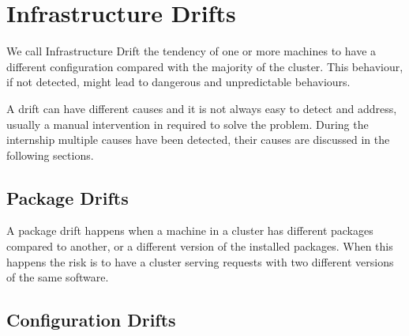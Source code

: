 \section{Infrastructure Drifts}

We call Infrastructure Drift the tendency of one or more machines to have
a different configuration compared with the majority of the cluster. This
behaviour, if not detected, might lead to dangerous and unpredictable
behaviours.

A drift can have different causes and it is not always easy to detect and
address, usually a manual intervention in required to solve the problem.
During the internship multiple causes have been detected, their causes are
discussed in the following sections.

\subsection{Package Drifts}

A package drift happens when a machine in a cluster has different packages
compared to another, or a different version of the installed packages.
When this happens the risk is to have a cluster serving requests with two
different versions of the same software.

\subsection{Configuration Drifts}
